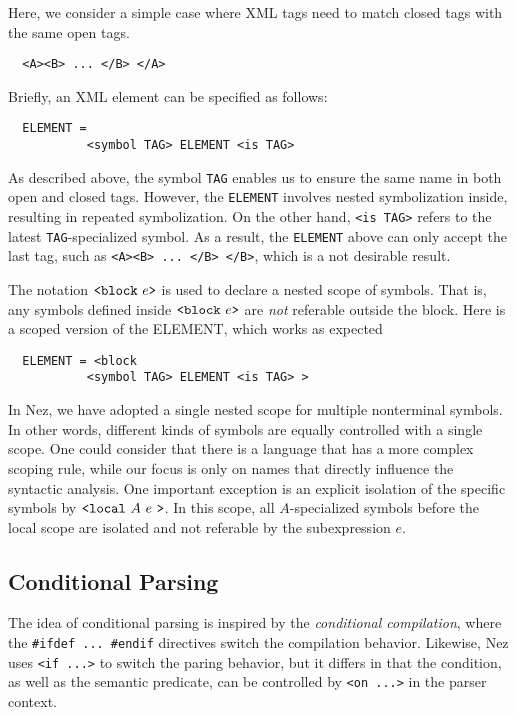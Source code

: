 \documentclass[preprint]{sigplanconf}
\begin{document}
Here, we consider a simple case where XML tags need to match closed tags with the same open tags.

{\small \begin{verbatim}
  <A><B> ... </B> </A>
\end{verbatim}}

Briefly, an XML element can be specified as follows: 

{\small \begin{verbatim}
  ELEMENT = 
           <symbol TAG> ELEMENT <is TAG>
\end{verbatim}}

As described above, the symbol {\tt TAG} enables us to ensure the same name in both open and closed tags. However, the {\tt ELEMENT} involves nested symbolization inside, resulting in repeated symbolization. On the other hand, {\small \verb|<is TAG>|} refers to the latest {\tt TAG}-specialized symbol. As a result, the {\tt ELEMENT} above can only accept the last tag, such as {\small \verb|<A><B> ... </B> </B>|}, which is a not desirable result. 

The notation {\small $\verb|<block|~e\verb|>|$} is used to declare a nested scope of symbols. That is, any symbols defined inside {\small $\verb|<block|~e\verb|>|$} are {\em not} referable outside the block. Here is a scoped version of the ELEMENT, which works as expected

{\small \begin{verbatim}
  ELEMENT = <block 
           <symbol TAG> ELEMENT <is TAG> >
\end{verbatim}}



In Nez, we have adopted a single nested scope for multiple nonterminal symbols. In other words, different kinds of symbols are equally controlled with a single scope. One could consider that there is a language that has a more complex scoping rule, while our focus is only on names that directly influence the syntactic analysis. One important exception is an explicit isolation of the specific symbols by {\small $\verb|<local|~A~e~\verb|>|$}. In this scope, all $A$-specialized symbols before the local scope are isolated and not referable by the subexpression $e$. 


\subsection{Conditional Parsing}

The idea of conditional parsing is inspired by the {\em conditional compilation}, where the {\tt \#ifdef ... \#endif} directives switch the compilation behavior. Likewise, Nez uses \verb|<if ...>| to switch the paring behavior, but it differs in that the condition, as well as the semantic predicate, can be controlled by \verb|<on ...>| in the parser context. 
\end{document}
